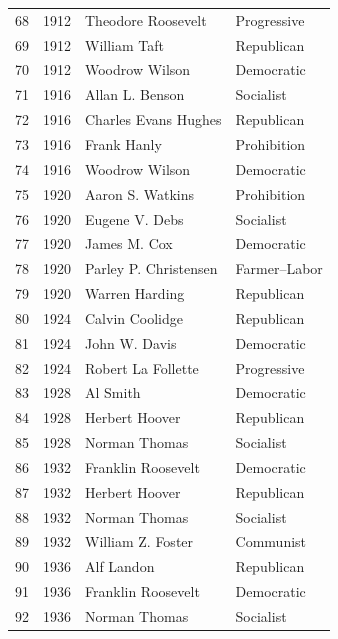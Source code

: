 \documentclass[
  letterpaper,
  DIV=11,
  numbers=noendperiod]{scrreprt}
\begin{document}
\begin{tabular}{lrll}
68  &  1912 &      Theodore Roosevelt &            Progressive \\
69  &  1912 &            William Taft &             Republican \\
70  &  1912 &          Woodrow Wilson &             Democratic \\
71  &  1916 &         Allan L. Benson &              Socialist \\
72  &  1916 &    Charles Evans Hughes &             Republican \\
73  &  1916 &             Frank Hanly &            Prohibition \\
74  &  1916 &          Woodrow Wilson &             Democratic \\
75  &  1920 &        Aaron S. Watkins &            Prohibition \\
76  &  1920 &          Eugene V. Debs &              Socialist \\
77  &  1920 &            James M. Cox &             Democratic \\
78  &  1920 &   Parley P. Christensen &           Farmer–Labor \\
79  &  1920 &          Warren Harding &             Republican \\
80  &  1924 &         Calvin Coolidge &             Republican \\
81  &  1924 &           John W. Davis &             Democratic \\
82  &  1924 &      Robert La Follette &            Progressive \\
83  &  1928 &                Al Smith &             Democratic \\
84  &  1928 &          Herbert Hoover &             Republican \\
85  &  1928 &           Norman Thomas &              Socialist \\
86  &  1932 &      Franklin Roosevelt &             Democratic \\
87  &  1932 &          Herbert Hoover &             Republican \\
88  &  1932 &           Norman Thomas &              Socialist \\
89  &  1932 &       William Z. Foster &              Communist \\
90  &  1936 &              Alf Landon &             Republican \\
91  &  1936 &      Franklin Roosevelt &             Democratic \\
92  &  1936 &           Norman Thomas &              Socialist \\

\end{tabular}
\end{document}

